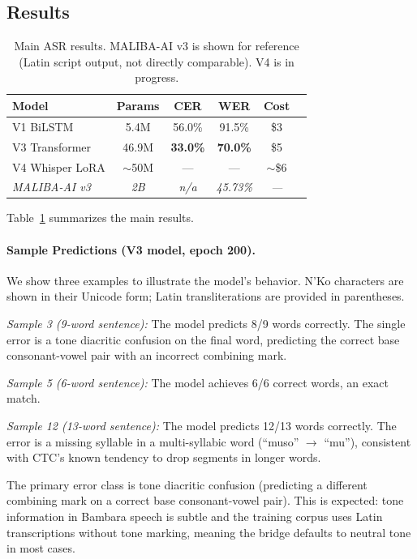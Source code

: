 \documentclass[11pt]{article}
\begin{document}
\subsection{Results}

\begin{table}[t]
\centering
\small
\begin{tabular}{lccccc}
\toprule
\textbf{Model} & \textbf{Params} & \textbf{CER} & \textbf{WER} & \textbf{Cost} \\
\midrule
V1 BiLSTM & 5.4M & 56.0\% & 91.5\% & \$3 \\
V3 Transformer & 46.9M & \textbf{33.0\%} & \textbf{70.0\%} & \$5 \\
V4 Whisper LoRA & ${\sim}$50M & --- & --- & ${\sim}$\$6 \\
\midrule
\textit{MALIBA-AI v3} & \textit{2B} & \textit{n/a} & \textit{45.73\%} & \textit{---} \\
\bottomrule
\end{tabular}
\caption{Main ASR results. MALIBA-AI v3 is shown for reference (Latin script output, not directly comparable). V4 is in progress.}
\label{tab:asr-results}
\end{table}

Table~\ref{tab:asr-results} summarizes the main results.

\paragraph{Sample Predictions (V3 model, epoch 200).}
We show three examples to illustrate the model's behavior.
N'Ko characters are shown in their Unicode form; Latin transliterations are provided in parentheses.

\textit{Sample 3 (9-word sentence):}
The model predicts 8/9 words correctly.
The single error is a tone diacritic confusion on the final word, predicting the correct base consonant-vowel pair with an incorrect combining mark.

\textit{Sample 5 (6-word sentence):}
The model achieves 6/6 correct words, an exact match.

\textit{Sample 12 (13-word sentence):}
The model predicts 12/13 words correctly.
The error is a missing syllable in a multi-syllabic word (``muso'' $\to$ ``mu''), consistent with CTC's known tendency to drop segments in longer words.

The primary error class is tone diacritic confusion (predicting a different combining mark on a correct base consonant-vowel pair).
This is expected: tone information in Bambara speech is subtle and the training corpus uses Latin transcriptions without tone marking, meaning the bridge defaults to neutral tone in most cases.
\end{document}
